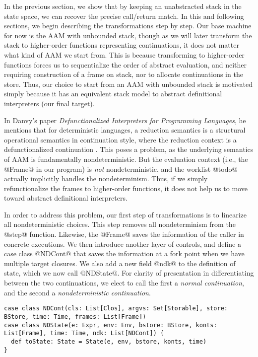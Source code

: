 \documentclass[acmsmall]{acmart}\settopmatter{}
\begin{document}
In the previous section, we show that by keeping an unabstracted stack in the state
space, we can recover the precise call/return match.
In this and following sections, we begin describing the transformations step by step.
Our base machine for now is the AAM with unbounded stack, though
as we will later transform the stack to higher-order functions
representing continuations, it does not matter what kind of AAM we start from.
This is because transforming to higher-order functions forces us to sequentialize
the order of abstract evaluation, and neither requiring construction of a frame on stack,
nor to allocate continuations in the store.
Thus, our choice to start from an AAM with unbounded stack is motivated simply because
it has an equivalent stack model to abstract definitional interpreters (our final target).

In Danvy's paper \textit{Defunctionalized Interpreters for Programming
  Languages}, he mentions that for deterministic languages, a reduction semantics
is a structural operational semantics in continuation style, where the reduction
context is a defunctionalized continuation \cite{Danvy:2008:DIP:1411204.1411206}.
This poses a problem, as the underlying semantics of AAM is fundamentally nondeterministic.
But the evaluation context (i.e., the @Frame@ in our program) is \emph{not}
nondeterministic, and the worklist @todo@ actually implicitly handles the nondeterminism.
Thus, if we simply refunctionalize the frames to higher-order functions, 
it does not help us to move toward abstract definitional interpreters.

In order to address this problem, our first step of transformations
is to linearize all nondeterministic choices.
This step removes all nondeterminism from the @step@ function.
Likewise, the @Frame@ saves the information of the caller in concrete executions.
We then introduce another layer of controls, and define a case class @NDCont@
that saves the information at a fork point when we have multiple target closures.
We also add a new field @ndk@ to the definition of state, which we now call @NDState@.
For clarity of presentation in differentiating between the two continuations, we elect to call
the first a \emph{normal continuation}, and the second a \emph{nondeterministic continuation}.

\begin{lstlisting}
case class NDCont(cls: List[Clos], argvs: Set[Storable], store: BStore, time: Time, frames: List[Frame])
case class NDState(e: Expr, env: Env, bstore: BStore, konts: List[Frame], time: Time, ndk: List[NDCont]) {
  def toState: State = State(e, env, bstore, konts, time)
}
\end{lstlisting}
\end{document}
